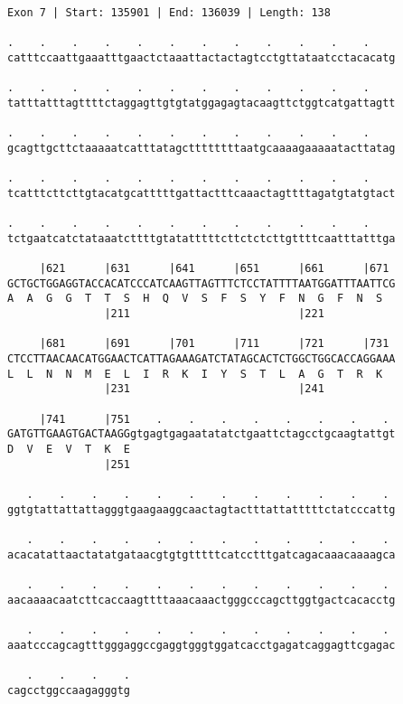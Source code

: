 \documentclass{article}
\begin{document}
\newpage
\begin{Verbatim}
Exon 7 | Start: 135901 | End: 136039 | Length: 138
 
.    .    .    .    .    .    .    .    .    .    .    .    
catttccaattgaaatttgaactctaaattactactagtcctgttataatcctacacatg
  
.    .    .    .    .    .    .    .    .    .    .    .    
tatttatttagttttctaggagttgtgtatggagagtacaagttctggtcatgattagtt
  
.    .    .    .    .    .    .    .    .    .    .    .    
gcagttgcttctaaaaatcatttatagcttttttttaatgcaaaagaaaaatacttatag
  
.    .    .    .    .    .    .    .    .    .    .    .    
tcatttcttcttgtacatgcatttttgattactttcaaactagttttagatgtatgtact
  
.    .    .    .    .    .    .    .    .    .    .    .    
tctgaatcatctataaatcttttgtatatttttcttctctcttgttttcaatttatttga
  
     |621      |631      |641      |651      |661      |671 
GCTGCTGGAGGTACCACATCCCATCAAGTTAGTTTCTCCTATTTTAATGGATTTAATTCG
A  A  G  G  T  T  S  H  Q  V  S  F  S  Y  F  N  G  F  N  S  
               |211                          |221           
  
     |681      |691      |701      |711      |721      |731 
CTCCTTAACAACATGGAACTCATTAGAAAGATCTATAGCACTCTGGCTGGCACCAGGAAA
L  L  N  N  M  E  L  I  R  K  I  Y  S  T  L  A  G  T  R  K  
               |231                          |241           
  
     |741      |751    .    .    .    .    .    .    .    . 
GATGTTGAAGTGACTAAGGgtgagtgagaatatatctgaattctagcctgcaagtattgt
D  V  E  V  T  K  E                                         
               |251                                         
  
   .    .    .    .    .    .    .    .    .    .    .    . 
ggtgtattattattagggtgaagaaggcaactagtactttattatttttctatcccattg
  
   .    .    .    .    .    .    .    .    .    .    .    . 
acacatattaactatatgataacgtgtgtttttcatcctttgatcagacaaacaaaagca
  
   .    .    .    .    .    .    .    .    .    .    .    . 
aacaaaacaatcttcaccaagttttaaacaaactgggcccagcttggtgactcacacctg
  
   .    .    .    .    .    .    .    .    .    .    .    . 
aaatcccagcagtttgggaggccgaggtgggtggatcacctgagatcaggagttcgagac
  
   .    .    .    .
cagcctggccaagagggtg
\end{Verbatim}
\end{document}

